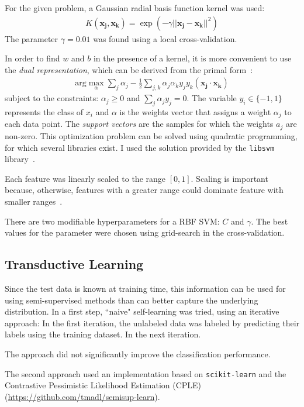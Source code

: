 \documentclass[a4paper]{article}
\begin{document}
For the given problem, a Gaussian radial basis function kernel was
used:
\begin{align}
K(\mathbf{x_j}, \mathbf{x_k}) = \exp(-\gamma||\mathbf{x_j} - \mathbf{x_k} ||^2)
\end{align}
The parameter $\gamma = 0.01$ was found using a local
cross-validation.

In order to find $w$ and $b$ in the presence of a kernel, it is more
convenient to use the \emph{dual representation}, which can be derived
from the primal form~\cite{russell2003artificial}:
\begin{align}
\label{eq:dual}
\text{arg}\max_\alpha\sum_j\alpha_j - \frac{1}{2}\sum_{j,k}\alpha_j\alpha_ky_jy_k(\mathbf{x_j} \cdot \mathbf{x_k})
\end{align} subject to the constraints: $\alpha_j \geq 0$ and
$\sum_j\alpha_jy_j=0$. The variable $y_i \in \{-1, 1\}$ represents the
class of $x_i$ and $\alpha$ is the weights vector that assigns a weight
$\alpha_j$ to each data point. The \emph{support vectors} are the
samples for which the weights $a_j$ are non-zero. 
This optimization problem can be solved using
quadratic programming, for which several libraries
exist. I used the solution provided by the \texttt{libsvm} library~\cite{libsvm2011}.

Each feature was linearly scaled to the range $[0, 1]$. Scaling is
important because, otherwise, features with a greater range could
dominate feature with smaller ranges~\cite{hsu2003practical}.

There are two modifiable hyperparameters for a RBF SVM: $C$ and
$\gamma$. The best values for the parameter were chosen using
grid-search in the cross-validation.


\subsection{Transductive Learning}

Since the test data is known at training time, this information can be
used for using semi-supervised methods than can better capture the
underlying distribution. In a first step, ``naive" self-learning was
tried, using an iterative approach: In the first iteration, the
unlabeled data was labeled by predicting their labels using the
training dataset. In the next iteration.

The approach did not
significantly improve the classification performance.

The second approach used an implementation based on
\texttt{scikit-learn} and the Contrastive Pessimistic Likelihood
Estimation (CPLE) (\url{https://github.com/tmadl/semisup-learn}).
\end{document}
